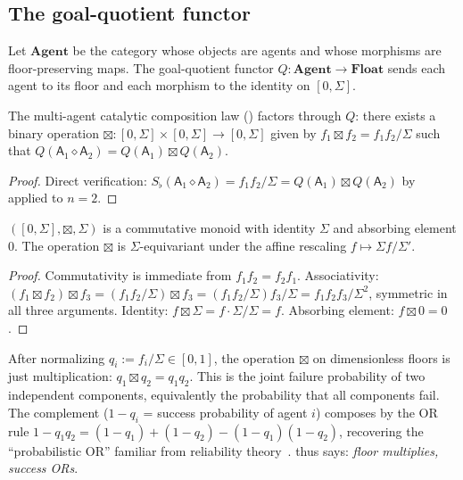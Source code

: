 \documentclass[11pt,a4paper]{article}
\newcommand{\agent}{\mathsf{A}}
\newcommand{\Sfloor}{S_{\flat}}
\newcommand{\Compose}{\diamond}
\begin{document}
\subsection{The goal-quotient functor}

\begin{construction}\label{con:gq-func}
Let $\mathbf{Agent}$ be the category whose objects are agents and whose
morphisms are floor-preserving maps. The goal-quotient functor
$Q:\mathbf{Agent}\to\mathbf{Float}$ sends each agent to its floor and
each morphism to the identity on $[0,\Sigma]$.
\end{construction}

\begin{theorem}
\label{thm:cat-fact}
The multi-agent catalytic composition law ()
factors through $Q$: there exists a binary operation
$\boxtimes:[0,\Sigma]\times[0,\Sigma]\to[0,\Sigma]$ given by
$f_1\boxtimes f_2=f_1f_2/\Sigma$ such that
$Q(\agent_1\Compose\agent_2)=Q(\agent_1)\boxtimes Q(\agent_2)$.
\end{theorem}

\begin{proof}
Direct verification: $\Sfloor(\agent_1\Compose\agent_2)=
f_1f_2/\Sigma=Q(\agent_1)\boxtimes Q(\agent_2)$ by 
applied to $n=2$.
\end{proof}

\begin{proposition}
\label{prop:boxtimes}
$([0,\Sigma],\boxtimes,\Sigma)$ is a commutative monoid with identity
$\Sigma$ and absorbing element $0$. The operation $\boxtimes$ is
$\Sigma$-equivariant under the affine rescaling
$f\mapsto\Sigma f/\Sigma'$.
\end{proposition}

\begin{proof}
Commutativity is immediate from $f_1f_2=f_2f_1$. Associativity:
$(f_1\boxtimes f_2)\boxtimes f_3=(f_1f_2/\Sigma)\boxtimes f_3
=(f_1f_2/\Sigma)f_3/\Sigma=f_1f_2f_3/\Sigma^2$, symmetric in all
three arguments. Identity: $f\boxtimes\Sigma=f\cdot\Sigma/\Sigma=f$.
Absorbing element: $f\boxtimes 0=0$.
\end{proof}

\begin{remark}
\label{rem:or}
After normalizing $q_i:=f_i/\Sigma\in[0,1]$, the operation
$\boxtimes$ on dimensionless floors is just multiplication:
$q_1\boxtimes q_2=q_1q_2$. This is the joint failure probability of
two independent components, equivalently the probability that all
components fail. The complement ($1-q_i$ = success probability of
agent $i$) composes by the OR rule
$1-q_1q_2=(1-q_1)+(1-q_2)-(1-q_1)(1-q_2)$, recovering the
``probabilistic OR'' familiar from reliability
theory~\cite{lewis1969,vonneumannmorgenstern1944}.
 thus says: \emph{floor multiplies, success ORs}.
\end{remark}
\end{document}
